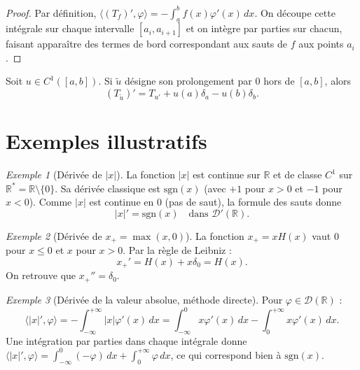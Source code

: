 \documentclass[12pt,a4paper,openany]{book}
\theoremstyle{definition}
\theoremstyle{plain}
\theoremstyle{remark}
\newtheorem*{example}{Exemple}
\newenvironment{exemple}{\begin{example}}{\end{example}}
\begin{document}
	\begin{proof}
		Par définition, $\langle (T_f)', \varphi \rangle = -\int_a^b f(x)\varphi'(x)\,dx$. On découpe cette intégrale sur chaque intervalle $[a_i, a_{i+1}]$ et on intègre par parties sur chacun, faisant apparaître des termes de bord correspondant aux sauts de $f$ aux points $a_i$.
	\end{proof}
	
	\begin{proposition}
		Soit $u \in C^1([a,b])$. Si $\tilde{u}$ désigne son prolongement par $0$ hors de $[a,b]$, alors
		\[
		(T_{\tilde{u}})' = T_{u'} + u(a)\delta_a - u(b)\delta_b.
		\]
	\end{proposition}
	
	\section{Exemples illustratifs}
	
	\begin{exemple}[Dérivée de $|x|$]
		La fonction $|x|$ est continue sur $\mathbb{R}$ et de classe $C^1$ sur $\mathbb{R}^* = \mathbb{R} \setminus \{0\}$. Sa dérivée classique est $\mathrm{sgn}(x)$ (avec $+1$ pour $x>0$ et $-1$ pour $x<0$). Comme $|x|$ est continue en $0$ (pas de saut), la formule des sauts donne
		\[
		|x|' = \mathrm{sgn}(x) \quad \text{dans } \mathcal{D}'(\mathbb{R}).
		\]
	\end{exemple}
	
	\begin{exemple}[Dérivée de $x_+ = \max(x,0)$]
		La fonction $x_+ = xH(x)$ vaut $0$ pour $x \leq 0$ et $x$ pour $x > 0$. Par la règle de Leibniz :
		\[
		x_+' = H(x) + x\delta_0 = H(x).
		\]
		On retrouve que $x_+'' = \delta_0$.
	\end{exemple}
	
	\begin{exemple}[Dérivée de la valeur absolue, méthode directe]
		Pour $\varphi \in \mathcal{D}(\mathbb{R})$ :
		\[
		\langle |x|', \varphi \rangle = -\int_{-\infty}^{+\infty} |x| \varphi'(x)\,dx = \int_{-\infty}^0 x\varphi'(x)\,dx - \int_0^{+\infty} x\varphi'(x)\,dx.
		\]
		Une intégration par parties dans chaque intégrale donne $\langle |x|', \varphi \rangle = \int_{-\infty}^0 (-\varphi)\,dx + \int_0^{+\infty} \varphi\,dx$, ce qui correspond bien à $\mathrm{sgn}(x)$.
	\end{exemple}
	
\end{document}
